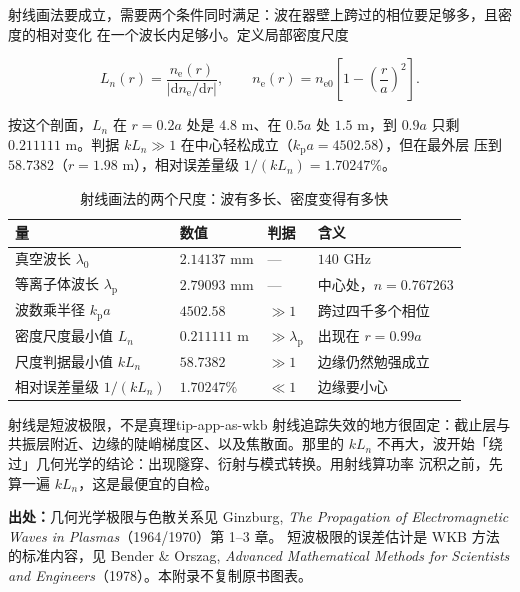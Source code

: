 射线画法要成立，需要两个条件同时满足：波在器壁上跨过的相位要足够多，且密度的相对变化
在一个波长内足够小。定义局部密度尺度

\begin{equation}
L_n(r)=\frac{n_\mathrm{e}(r)}{|\mathrm{d}n_\mathrm{e}/\mathrm{d}r|},
\qquad n_\mathrm{e}(r)=n_\mathrm{e0}\left[1-\left(\frac{r}{a}\right)^2\right].
\label{eq:app-as-scalelength}
\end{equation}

按这个剖面，$L_n$ 在 $r=0.2a$ 处是 $4.8$ m、在 $0.5a$ 处 $1.5$ m，到 $0.9a$ 只剩
$0.211111$ m。判据 $k L_n\gg1$ 在中心轻松成立（$k_\mathrm{p}a=4502.58$），但在最外层
压到 $58.7382$（$r=1.98$ m），相对误差量级 $1/(kL_n)=1.70247\%$。

\begin{table}[htbp]
\centering
\small
\caption{射线画法的两个尺度：波有多长、密度变得有多快}
\label{tab:app-as-wkb}
\begin{tabular}{p{3.2cm}p{3.2cm}p{3.3cm}p{3.4cm}}
\hline
量 & 数值 & 判据 & 含义 \\
\hline
真空波长 $\lambda_0$ & $2.14137$ mm & --- & $140$ GHz \\
等离子体波长 $\lambda_\mathrm{p}$ & $2.79093$ mm & --- & 中心处，$n=0.767263$ \\
波数乘半径 $k_\mathrm{p}a$ & $4502.58$ & $\gg1$ & 跨过四千多个相位 \\
密度尺度最小值 $L_n$ & $0.211111$ m & $\gg\lambda_\mathrm{p}$ & 出现在 $r=0.99a$ \\
尺度判据最小值 $kL_n$ & $58.7382$ & $\gg1$ & 边缘仍然勉强成立 \\
相对误差量级 $1/(kL_n)$ & $1.70247\%$ & $\ll1$ & 边缘要小心 \\
\hline
\end{tabular}
\end{table}

\begin{tip}{射线是短波极限，不是真理}{tip-app-as-wkb}
射线追踪失效的地方很固定：截止层与共振层附近、边缘的陡峭梯度区、以及焦散面。那里的
$kL_n$ 不再大，波开始「绕过」几何光学的结论：出现隧穿、衍射与模式转换。用射线算功率
沉积之前，先算一遍 $kL_n$，这是最便宜的自检。
\end{tip}

{\footnotesize
\textbf{出处：}几何光学极限与色散关系见 Ginzburg, \emph{The Propagation of
Electromagnetic Waves in Plasmas}（1964/1970）第 1--3 章。
短波极限的误差估计是 WKB
方法的标准内容，见 Bender \& Orszag, \emph{Advanced Mathematical Methods for
Scientists and Engineers}（1978）。本附录不复制原书图表。
}


